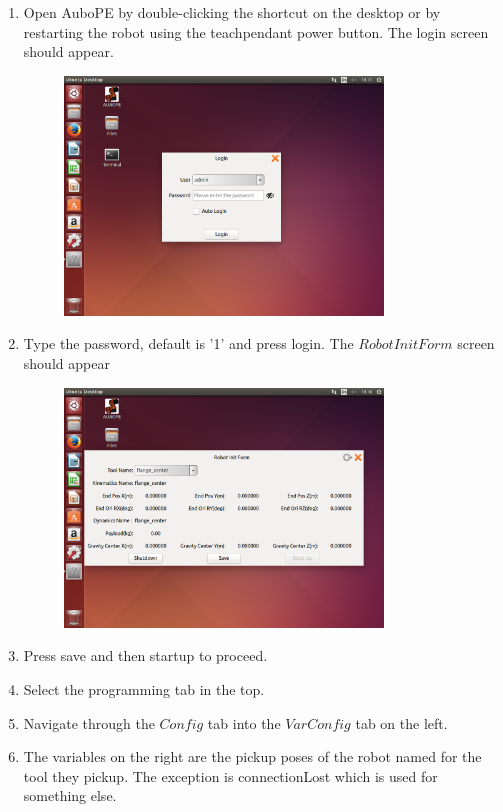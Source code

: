 \documentclass{article}
\begin{document}
\begin{enumerate}
\item Open AuboPE by double-clicking the shortcut on the desktop or by restarting the robot using the teachpendant power button. The login screen should appear.
\begin{figure}[H]\centering
\includegraphics[width=0.8\textwidth]{../../Images/loginScreen.png}
\end{figure}
\item  Type the password, default is '1' and press login. The $Robot Init Form$ screen should appear
\begin{figure}[H]\centering
\includegraphics[width=0.8\textwidth]{../../Images/RobotInitForm.png}
\end{figure}
\item Press save and then startup to proceed.
\item Select the programming tab in the top.
\item Navigate through the $Config$ tab into the $Var Config$ tab on the left.
\item The variables on the right are the pickup poses of the robot named for the tool they pickup. The exception is connectionLost which is used for something else. 

\end{enumerate}
\end{document}
